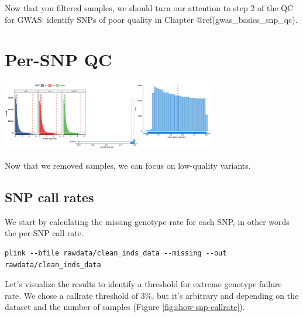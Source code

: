 \documentclass[
]{book}
\newenvironment{Shaded}{\begin{snugshade}}{\end{snugshade}}
\newcommand{\CommentTok}[1]{\textcolor[rgb]{0.56,0.35,0.01}{\textit{#1}}}
\newcommand{\DecValTok}[1]{\textcolor[rgb]{0.00,0.00,0.81}{#1}}
\newcommand{\FunctionTok}[1]{\textcolor[rgb]{0.00,0.00,0.00}{#1}}
\newcommand{\NormalTok}[1]{#1}
\newcommand{\OtherTok}[1]{\textcolor[rgb]{0.56,0.35,0.01}{#1}}
\newcommand{\SpecialCharTok}[1]{\textcolor[rgb]{0.00,0.00,0.00}{#1}}
\newcommand{\StringTok}[1]{\textcolor[rgb]{0.31,0.60,0.02}{#1}}
\begin{document}
Now that you filtered samples, we should turn our attention to step 2 of the QC for GWAS: identify SNPs of poor quality in Chapter @ref(gwas\_basics\_snp\_qc).

\hypertarget{gwas_basics_snp_qc}{%
\chapter{Per-SNP QC}\label{gwas_basics_snp_qc}}

\includegraphics[width=0.7\textwidth,height=\textheight]{img/gwas_snp_qc.png}

Now that we removed samples, we can focus on low-quality variants.

\hypertarget{snp-call-rates}{%
\section{SNP call rates}\label{snp-call-rates}}

We start by calculating the missing genotype rate for each SNP, in other words the per-SNP call rate.

\begin{verbatim}
plink --bfile rawdata/clean_inds_data --missing --out rawdata/clean_inds_data
\end{verbatim}

Let's visualize the results to identify a threshold for extreme genotype failure rate. We chose a callrate threshold of 3\%, but it's arbitrary and depending on the dataset and the number of samples (Figure \ref{fig:show-snp-callrate}).

\begin{Shaded}
\end{Shaded}
\end{document}
